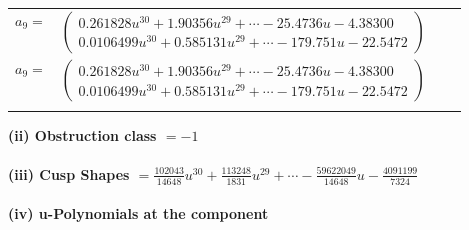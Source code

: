 \documentclass[1p]{elsarticle_modified}
\theoremstyle{definition}
\begin{document}
\begin{tabular}{m{7pt} m{180pt} m{7pt} m{180pt} }
\flushright $a_{9}=$&$\begin{pmatrix}0.261828 u^{30}+1.90356 u^{29}+\cdots-25.4736 u-4.38300\\0.0106499 u^{30}+0.585131 u^{29}+\cdots-179.751 u-22.5472\end{pmatrix}$\\ \flushright $a_{9}=$&$\begin{pmatrix}0.261828 u^{30}+1.90356 u^{29}+\cdots-25.4736 u-4.38300\\0.0106499 u^{30}+0.585131 u^{29}+\cdots-179.751 u-22.5472\end{pmatrix}$\\&\end{tabular}
\flushleft \textbf{(ii) Obstruction class $= -1$}\\~\\
\flushleft \textbf{(iii) Cusp Shapes $= \frac{102043}{14648} u^{30}+\frac{113248}{1831} u^{29}+\cdots-\frac{59622049}{14648} u-\frac{4091199}{7324}$}\\~\\
\newpage\renewcommand{\arraystretch}{1}
\flushleft \textbf{(iv) u-Polynomials at the component}\newline \\
\end{document}
